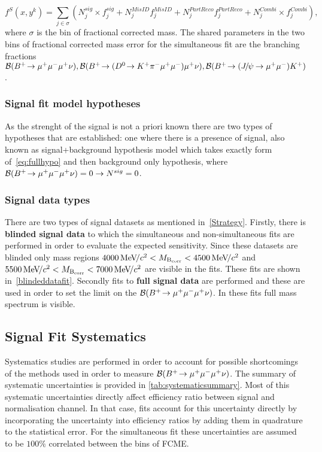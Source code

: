 \begin{equation}
f^{S}(x,y^{k})=\sum_{j\in{\sigma}}(N_{j}^{sig}\times f_{j}^{sig} + N_{j}^{MisID}f_{j}^{MisID} + N_{j}^{PartReco}f_{j}^{PartReco} + N_{j}^{Combi} \times f_{j}^{Combi}),
\label{eq:fullhypo2}
\end{equation}
where $\sigma$ is the bin of fractional corrected mass. The shared parameters in the two bins of fractional corrected mass error for the simultaneous fit are the branching fractions $\mathcal{B}({{{B}^+}}\!\rightarrow {\ensuremath{\mu^+\mu^-\mu^+}}\nu),\mathcal{B}({{{B}^+}}\!\rightarrow ({{D}^0}\!\rightarrow {\ensuremath{{K}^+}}{\ensuremath{{\pi}^-}}{\ensuremath{\mu^+\mu^-}}){\mu^+}\nu),\mathcal{B}({{{B}^+}}\!\rightarrow ({{J\mskip -3mu/\mskip -2mu\psi\mskip 2mu}}\!\rightarrow {\ensuremath{\mu^+\mu^-}}){{K}^+})$. 

\subsubsection{Signal fit model hypotheses}
As the strenght of the signal is not a priori known there are two types of hypotheses that are established: one where there is a presence of signal, also known as signal+background hypothesis model which takes exactly form of~\autoref{eq:fullhypo} and then background only hypothesis, where $\mathcal{B}({{{B}^+}}\!\rightarrow {\ensuremath{\mu^+\mu^-\mu^+}}\nu)=0 \rightarrow N^{sig}=0$.

\subsubsection{Signal data types}

There are two types of signal datasets as mentioned in~\autoref{Strategy}. Firstly, there is \textbf{blinded signal data} to which the simultaneous and non-simultaneous fits are performed in order to evaluate the expected sensitivity. Since these datasets are blinded only mass regions $4000{{\mathrm{\,Me\kern -0.1em V\!/}c^2}}<M_{\rm{B_{corr}}}<{4500{\mathrm{\,Me\kern -0.1em V\!/}c^2}}$ and $5500{{\mathrm{\,Me\kern -0.1em V\!/}c^2}}<M_{\rm{B_{corr}}}<{7000{\mathrm{\,Me\kern -0.1em V\!/}c^2}}$ are visible in the fits. These fits are shown in~\autoref{blindeddatafit}. Secondly fits to \textbf{full signal data} are performed and these are used in order to set the limit on the $\mathcal{B}({{{B}^+}}\!\rightarrow {\ensuremath{\mu^+\mu^-\mu^+}}\nu)$. In these fits full mass spectrum is visible.

\subsection{Signal Fit Systematics}
\label{systematics}
Systematics studies are performed in order to account for possible shortcomings of the methods used in order to measure $\mathcal{B}({{{B}^+}}\!\rightarrow {\ensuremath{\mu^+\mu^-\mu^+}}\nu)$. The summary of systematic uncertainties is provided in \autoref{tab:systematicsummary}. Most of this systematic uncertainties directly affect efficiency ratio between signal and normalisation channel. In that case, fits account for this uncertainty directly by incorporating the uncertainty into efficiency ratios by adding them in quadrature to the statistical error. For the simultaneous fit these uncertainties are assumed to be $100\%$ correlated between the bins of FCME.


